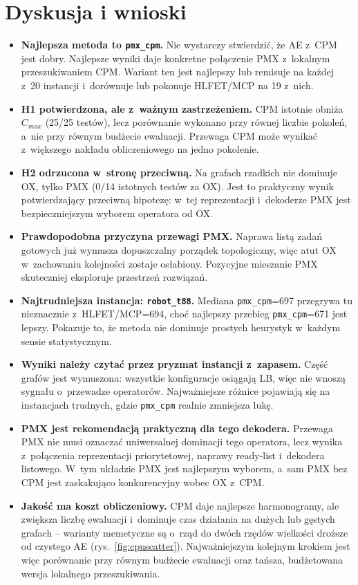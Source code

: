 \documentclass[12pt,a4paper]{article}
\begin{document}
\section{Dyskusja i wnioski}
\label{sec:wnioski}
\begin{itemize}[itemsep=3pt, topsep=3pt]
    \item \textbf{Najlepsza metoda to \texttt{pmx\_cpm}.} Nie wystarczy stwierdzić, że AE z~CPM jest
    dobry. Najlepsze wyniki daje konkretne połączenie PMX z~lokalnym przeszukiwaniem CPM. Wariant ten
    jest najlepszy lub remisuje na każdej z~20 instancji i~dorównuje lub pokonuje HLFET/MCP na 19
    z~nich.
    \item \textbf{H1 potwierdzona, ale z~ważnym zastrzeżeniem.} CPM istotnie obniża $C_{max}$
    (25/25 testów), lecz porównanie wykonano przy równej liczbie pokoleń, a~nie przy równym budżecie
    ewaluacji. Przewaga CPM może wynikać z~większego nakładu obliczeniowego na jedno pokolenie.
    \item \textbf{H2 odrzucona w~stronę przeciwną.} Na grafach rzadkich nie dominuje OX, tylko PMX
    (0/14 istotnych testów za OX). Jest to praktyczny wynik potwierdzający przeciwną hipotezę:
    w~tej reprezentacji i~dekoderze PMX jest bezpieczniejszym wyborem operatora od OX.
    \item \textbf{Prawdopodobna przyczyna przewagi PMX.} Naprawa listą zadań gotowych już wymusza
    dopuszczalny porządek topologiczny, więc atut OX w~zachowaniu kolejności zostaje osłabiony.
    Pozycyjne mieszanie PMX skuteczniej eksploruje przestrzeń rozwiązań.
    \item \textbf{Najtrudniejsza instancja: \texttt{robot\_t88}.} Mediana \texttt{pmx\_cpm}=697
    przegrywa tu nieznacznie z~HLFET/MCP=694, choć najlepszy przebieg \texttt{pmx\_cpm}=671 jest lepszy.
    Pokazuje to, że metoda nie dominuje prostych heurystyk w~każdym sensie statystycznym.
    \item \textbf{Wyniki należy czytać przez pryzmat instancji z~zapasem.} Część grafów jest wymuszona:
    wszystkie konfiguracje osiągają LB, więc nie wnoszą sygnału o~przewadze operatorów. Najważniejsze
    różnice pojawiają się na instancjach trudnych, gdzie \texttt{pmx\_cpm} realnie zmniejsza lukę.
    \item \textbf{PMX jest rekomendacją praktyczną dla tego dekodera.} Przewaga PMX nie musi oznaczać
    uniwersalnej dominacji tego operatora, lecz wynika z~połączenia reprezentacji priorytetowej,
    naprawy ready-list i~dekodera listowego. W~tym układzie PMX jest najlepszym wyborem, a~sam PMX
    bez CPM jest zaskakująco konkurencyjny wobec OX z~CPM.
    \item \textbf{Jakość ma koszt obliczeniowy.} CPM daje najlepsze harmonogramy, ale zwiększa liczbę
    ewaluacji i~dominuje czas działania na dużych lub gęstych grafach -- warianty memetyczne są o~rząd
    do dwóch rzędów wielkości droższe od czystego AE (rys.~\ref{fig:cpuscatter}). Najważniejszym
    kolejnym krokiem jest więc porównanie przy równym budżecie ewaluacji oraz tańsza, budżetowana
    wersja lokalnego przeszukiwania.
\end{itemize}
\end{document}
